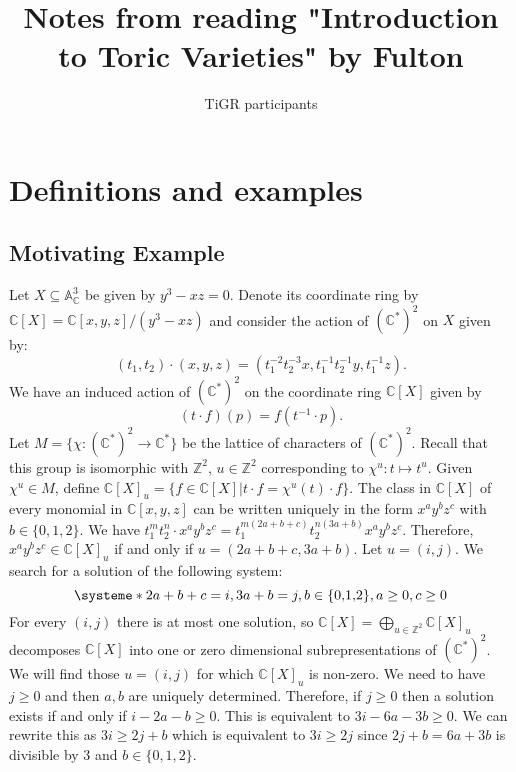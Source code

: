 \documentclass[10pt,a4paper]{book}
\title{Notes from reading "Introduction to Toric Varieties" by Fulton}
\author{TiGR participants}
\newcommand{\jarek}[1]{\todo[color=green!40]{JB: #1}}             %
\newcommand{\jarekI}[1]{\todo[inline,color=green!40]{JB: #1}}     %
\begin{document}
\maketitle
\chapter{Definitions and examples}
\section{Motivating Example}
Let $X\subseteq \mathbb{A}^3_\mathbb{C}$ be given by $y^3-xz=0$. Denote its coordinate ring by $\mathbb{C}[X]=\mathbb{C}[x,y,z]/(y^3-xz)$%
and consider the action of $(\mathbb{C}^*)^2$ on $X$ given by:
\[
(t_1,t_2)\cdot (x,y,z) = (t_1^{-2}t_2^{-3}x, t_1^{-1}t_2^{-1}y, t_1^{-1}z).
\]
We have an induced action of $(\mathbb{C}^*)^2$ on the coordinate ring $\mathbb{C}[X]$ given by 
\[
(t\cdot f)(p) = f(t^{-1}\cdot p).
\]
Let $M =\{\chi\colon (\mathbb{C}^*)^2\to \mathbb{C}^*\}$ be the lattice of characters of $(\mathbb{C}^*)^2$. Recall that this group is isomorphic with $\mathbb{Z}^2$, $u\in \mathbb{Z}^2$ corresponding to $\chi^{u}\colon t\mapsto t^u$. Given $\chi^u\in M$, define $\mathbb{C}[X]_{u} = \{f\in \mathbb{C}[X] | t\cdot f = \chi^u(t)\cdot f\}$.
The class in $\mathbb{C}[X]$ of every monomial in $\mathbb{C}[x,y,z]$ can be written uniquely in the form $x^ay^bz^c$ with $b\in\{0,1,2\}$. We have $t_1^mt_2^n\cdot x^ay^bz^c = t_1^{m(2a+b+c)}t_2^{n(3a+b)}x^ay^bz^c$. Therefore, $x^ay^bz^c \in \mathbb{C}[X]_{u}$ if and only if $u = (2a+b+c, 3a+b)$. 
Let $u=(i,j)$. We search for a solution of the following system:
\[
\systeme*{2a+b+c = i, 3a+b = j, b\in\{\text{0,1,2}\},a\geq 0, c\geq 0}
\]
For every $(i,j)$ there is at most one solution, so $\mathbb{C}[X]=\bigoplus_{u\in \mathbb{Z}^2}\mathbb{C}[X]_u$ decomposes $\mathbb{C}[X]$ into one or zero dimensional subrepresentations of $(\mathbb{C}^*)^2$. We will find those $u=(i,j)$ for which $\mathbb{C}[X]_u$ is non-zero. We need to have $j\geq 0$ and then $a,b$ are uniquely determined. Therefore, if $j\geq 0$ then a solution exists if and only if $i-2a-b\geq 0$. This is equivalent to $3i-6a-3b\geq 0$. We can rewrite this as $3i \geq 2j+b$ which is equivalent to $3i\geq 2j$ since $2j+b = 6a+3b$ is divisible by 3 and $b\in\{0,1,2\}$. 
\end{document}
